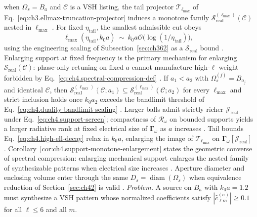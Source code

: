 when \(\Omega_{s}=B_{a}\) and \(\mathcal{C}\) is a VSH listing, the tail projector
\(\mathcal{T}_{\ell_{\max}}\) of Eq.~\eqref{eq:ch3.ellmax-truncation-projector} induces a monotone
family \(\mathcal{S}_{\mathrm{real}}^{(\ell_{\max})}(\mathcal{C})\) nested in \(\ell_{\max}\)
\cite{hansen1988}. For fixed \(\eta_{\mathrm{tail}}\), the smallest admissible cut obeys
\begin{equation}
\label{eq:ch4.ellmax-from-tail}
\ell_{\max}(\eta_{\mathrm{tail}},k_{0}a)
\ \sim\
k_{0}a
\mathcal{O}\!\big(\log(1/\eta_{\mathrm{tail}})\big),
\end{equation}
using the engineering scaling of Subsection~\ref{sec:ch362} as a $\mathcal{S}_{\mathrm{real}}$ bound
\cite{hansen1988}. Enlarging support
at fixed frequency is the primary mechanism for enlarging \(\mathcal{S}_{\mathrm{real}}(\mathcal{C})\):
phase-only retuning on fixed \(a\) cannot manufacture high-\(\ell\) weight forbidden by
Eq.~\eqref{eq:ch4.spectral-compression-def} \cite{stratton1941}.
\phantomsection\label{cor:ch4.support-monotone-enlargement}
If \(a_{1}<a_{2}\) with \(\Omega_{s}^{(j)}=B_{a_{j}}\) and identical \(\mathcal{C}\), then
\(\mathcal{S}_{\mathrm{real}}^{(\ell_{\max})}(\mathcal{C};a_{1})
\subseteq
\mathcal{S}_{\mathrm{real}}^{(\ell_{\max})}(\mathcal{C};a_{2})\)
for every \(\ell_{\max}\) and strict inclusion holds once \(k_{0}a_{2}\) exceeds the bandlimit
threshold of Eq.~\eqref{eq:ch4.duality-bandlimit-scaling} \cite{jackson1999}.
Larger balls admit strictly richer \(\mathcal{J}_{\mathrm{real}}\) under
Eq.~\eqref{eq:ch4.support-screen}; compactness of \(\mathcal{R}_\omega\) on bounded supports yields a
larger radiative rank at fixed electrical size of \(\boldsymbol{\Gamma}_\omega\) as \(a\) increases \cite{stratton1941}.
Tail bounds Eq.~\eqref{eq:ch4.high-ell-decay} relax in \(k_{0}a\), enlarging the image of
\(\mathcal{T}_{\ell_{\max}}\) on \(\boldsymbol{\Gamma}_\omega[\mathcal{J}_{\mathrm{real}}]\)
\cite{hansen1988}.
Corollary~\ref{cor:ch4.support-monotone-enlargement} states the geometric converse of spectral compression:
enlarging mechanical support enlarges the nested family of synthesizable patterns when electrical size increases
\cite{stratton1941}. Aperture diameter and enclosing volume enter through the same
\(D_{s}=\operatorname{diam}(\Omega_{s})\) when equivalence reduction of Section~\ref{sec:ch42} is valid
\cite{collin2001}.
\emph{Problem.} A source on \(B_{a}\) with \(k_{0}a=1.2\) must synthesize a VSH pattern whose normalized
coefficients satisfy \(|\widehat{c}_{\ell m}^{(\sigma)}|\ge 0.1\) for all \(\ell\le 6\) and all \(m\).
